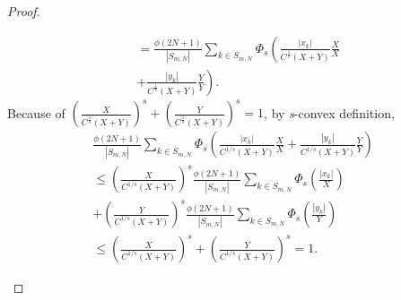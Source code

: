 \documentclass[10pt,a4paper]{amsart}
\begin{document}
\begin{proof}
\begin{enumerate}
\begin{eqnarray*}
            &=  \frac{\phi\left(2N+1\right)}{\left|S_{m,N}\right|}\sum_{k\in S_{m,N}}\Phi_s\left(\frac{\left|x_k\right|}{C^{\frac{1}{s}} \left(X+Y\right)}\frac{X}{X} \right.\\
            & \left.+\frac{\left|y_k\right|}{C^{\frac{1}{s}} \left(X+Y\right)}\frac{Y}{Y}\right). 
        \end{eqnarray*}
        Because of $\left(\frac{X}{C^{\frac{1}{s}} \left(X+Y\right)}\right)^s+\left(\frac{Y}{C^{\frac{1}{s}} \left(X+Y\right)}\right)^s=1$, by \emph{s}-convex definition,
        \begin{multline*}
            \frac{\phi(2N+1)}{|S_{m,N}|} \sum_{k\in S_{m,N}} 
            \Phi_s\!\left(
               \frac{|x_k|}{C^{1/s}(X+Y)}\frac{X}{X}
               + \frac{|y_k|}{C^{1/s}(X+Y)}\frac{Y}{Y}
            \right)
            \\
            \leq
            \left(\frac{X}{C^{1/s}(X+Y)}\right)^s 
               \frac{\phi(2N+1)}{|S_{m,N}|}\sum_{k\in S_{m,N}} \Phi_s\!\left(\frac{|x_k|}{X}\right)
            \\
            + \left(\frac{Y}{C^{1/s}(X+Y)}\right)^s 
               \frac{\phi(2N+1)}{|S_{m,N}|}\sum_{k\in S_{m,N}} \Phi_s\!\left(\frac{|y_k|}{Y}\right)
            \\
            \leq
            \left(\frac{X}{C^{1/s}(X+Y)}\right)^s
            + \left(\frac{Y}{C^{1/s}(X+Y)}\right)^s
            = 1.
        \end{multline*}



\end{enumerate}
\end{proof}
\end{document}
